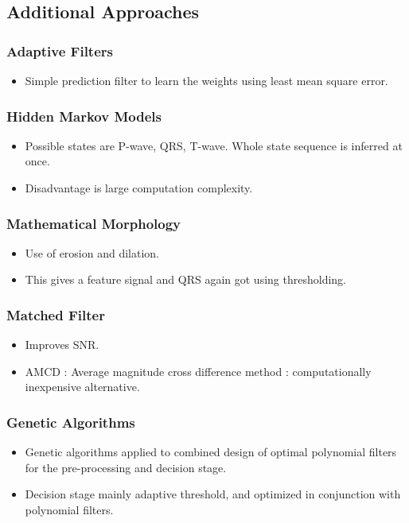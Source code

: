 \documentclass{article}
\begin{document}
\subsection{Additional Approaches}
\subsubsection{Adaptive Filters}
\begin{itemize}
\item Simple prediction filter to learn the weights using least mean square error.
\end{itemize}
\subsubsection{Hidden Markov Models}
\begin{itemize}
\item Possible states are P-wave, QRS, T-wave. Whole state sequence is inferred at once.
\item Disadvantage is large computation complexity.
\end{itemize}
\subsubsection{Mathematical Morphology}
\begin{itemize}
\item Use of erosion and dilation.
\item This gives a feature signal and QRS again got using thresholding.
\end{itemize}
\subsubsection{Matched Filter}
\begin{itemize}
\item Improves SNR.
\item AMCD : Average magnitude cross difference method : computationally inexpensive alternative.
\end{itemize}
\subsubsection{Genetic Algorithms}
\begin{itemize}
\item Genetic algorithms applied to combined design of optimal polynomial filters for the pre-processing and decision stage.
\item Decision stage mainly adaptive threshold, and optimized in conjunction with polynomial filters.
\end{itemize}
\end{document}
